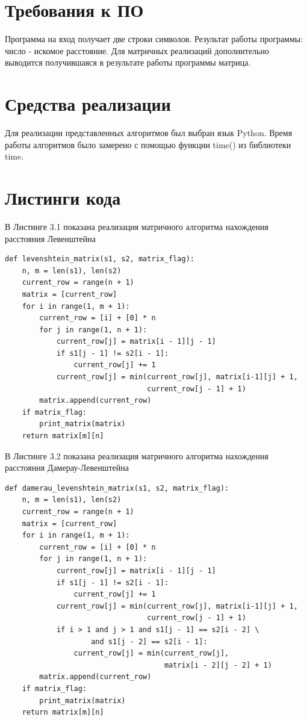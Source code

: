 \documentclass[a4paper,12pt]{report}
\begin{document}
\section{Требования к ПО}
Программа на вход получает две строки символов. Результат работы программы: число - искомое расстояние. Для матричных реализаций дополнительно выводится получившаяся в результате работы программы матрица.

\section{Средства реализации}
Для реализации представленных алгоритмов был выбран язык Python. Время работы алгоритмов было замерено с помощью функции time() из библиотеки time.

\section{Листинги кода}

\hspace{0.6cm}В Листинге 3.1 показана реализация матричного алгоритма нахождения расстояния Левенштейна
\begin{lstlisting}[caption=Функция нахождения расстояния Левенштейна матрично]
def levenshtein_matrix(s1, s2, matrix_flag):
    n, m = len(s1), len(s2)
    current_row = range(n + 1)
    matrix = [current_row]
    for i in range(1, m + 1):
        current_row = [i] + [0] * n
        for j in range(1, n + 1):
            current_row[j] = matrix[i - 1][j - 1]
            if s1[j - 1] != s2[i - 1]:
                current_row[j] += 1
            current_row[j] = min(current_row[j], matrix[i-1][j] + 1,
                                 current_row[j - 1] + 1)
        matrix.append(current_row)
    if matrix_flag:
        print_matrix(matrix)
    return matrix[m][n]
\end{lstlisting}

В Листинге 3.2 показана реализация матричного алгоритма нахождения расстояния Дамерау-Левенштейна
\begin{lstlisting}[caption=Функция нахождения расстояния Дамерау-Левенштейна матрично]
def damerau_levenshtein_matrix(s1, s2, matrix_flag):
    n, m = len(s1), len(s2)
    current_row = range(n + 1)
    matrix = [current_row]
    for i in range(1, m + 1):
        current_row = [i] + [0] * n
        for j in range(1, n + 1):
            current_row[j] = matrix[i - 1][j - 1]
            if s1[j - 1] != s2[i - 1]:
                current_row[j] += 1
            current_row[j] = min(current_row[j], matrix[i-1][j] + 1,
                                 current_row[j - 1] + 1)
            if i > 1 and j > 1 and s1[j - 1] == s2[i - 2] \
                    and s1[j - 2] == s2[i - 1]:
                current_row[j] = min(current_row[j],
                                     matrix[i - 2][j - 2] + 1)
        matrix.append(current_row)
    if matrix_flag:
        print_matrix(matrix)
    return matrix[m][n]
\end{lstlisting}
\end{document}
